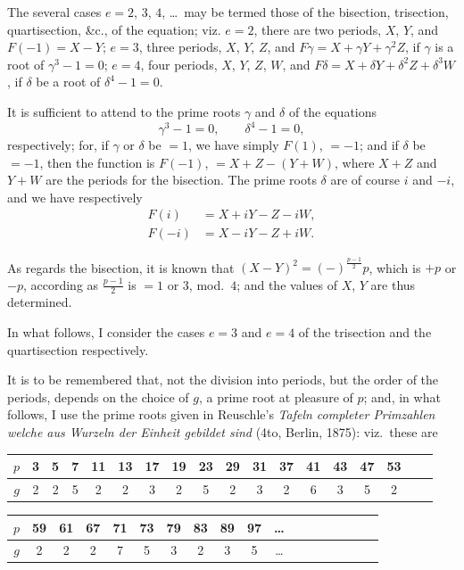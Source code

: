 \documentclass[11pt,a4paper]{book}
\begin{document}
The several cases $e=2$, $3$, $4$, \dots\ may be termed those of the
bisection, trisection, quartisection, \&c., of the equation; viz.
$e=2$, there are two periods, $X$, $Y$, and $F(-1)=X-Y$;
$e=3$, three periods, $X$, $Y$, $Z$, and $F\gamma=X+\gamma Y+\gamma^2Z$,
if $\gamma$ is a root of $\gamma^3-1=0$;
$e=4$, four periods, $X$, $Y$, $Z$, $W$, and
$F\delta=X+\delta Y+\delta^2Z+\delta^3W$, if $\delta$ be a root of $\delta^4-1=0$.

It is sufficient to attend to the prime roots $\gamma$ and $\delta$ of the equations
\[
\gamma^3-1=0,\qquad \delta^4-1=0,
\]
respectively; for, if $\gamma$ or $\delta$ be $=1$, we have simply $F(1)$, $=-1$;
and if $\delta$ be $=-1$, then the function is $F(-1)$, $=X+Z-(Y+W)$,
where $X+Z$ and $Y+W$ are the periods for the bisection.
The prime roots $\delta$ are of course $i$ and $-i$, and we have respectively
\begin{align*}
F(i) &= X+iY-Z-iW,\\
F(-i) &= X-iY-Z+iW.
\end{align*}

As regards the bisection, it is known that $(X-Y)^2 = (-)^{\frac{p-1}{2}}p$,
which is $+p$ or $-p$, according as $\frac{p-1}{2}$ is $=1$ or $3$, mod.~$4$;
and the values of $X$, $Y$ are thus determined.

In what follows, I consider the cases $e=3$ and $e=4$ of the
trisection and the quartisection respectively.

It is to be remembered that, not the division into periods, but the
order of the periods, depends on the choice of $g$, a prime root at
pleasure of $p$; and, in what follows, I use the prime roots given in
Reuschle's \textit{Tafeln completer Primzahlen welche aus Wurzeln der Einheit
gebildet sind} (4to, Berlin, 1875): viz.~these are

\begin{center}
\begin{tabular}{c|ccccccccccccccccc}
\toprule
$p$ & 3 & 5 & 7 & 11 & 13 & 17 & 19 & 23 & 29 & 31 & 37 & 41 & 43 & 47 & 53 \\
\midrule
$g$ & 2 & 2 & 5 & 2 & 2 & 3 & 2 & 5 & 2 & 3 & 2 & 6 & 3 & 5 & 2 \\
\bottomrule
\end{tabular}
\end{center}

\begin{center}
\begin{tabular}{c|ccccccccccccccccc}
\toprule
$p$ & 59 & 61 & 67 & 71 & 73 & 79 & 83 & 89 & 97 & \dots \\
\midrule
$g$ & 2 & 2 & 2 & 7 & 5 & 3 & 2 & 3 & 5 & \dots \\
\bottomrule
\end{tabular}
\end{center}
\end{document}

